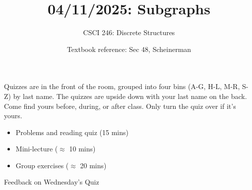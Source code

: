 \documentclass[10pt]{beamer}
\begin{document}




\title{04/11/2025: Subgraphs}
\author{CSCI 246: Discrete Structures}
\date{Textbook reference: Sec 48, Scheinerman}

\begin{frame}
    \titlepage 
\end{frame}


\begin{frame}
\small
\begin{mygreenbox}[title=Graded Quiz Pickup]
Quizzes are in the front of the room, grouped into four bins (A-G, H-L, M-R, S-Z) by last name. The quizzes are upside down with your last name on the back. Come find yours before, during, or after class. Only turn the quiz over if it's yours.
\end{mygreenbox} 
\vfill 
%
\vfill 
\begin{myyellowbox}[title=Today's Agenda]
\begin{itemize}
	\item Problems and reading quiz (15 mins)
	\item Mini-lecture ($\approx$ 10 mins)
	\item Group exercises ($\approx$ 20 mins)
\end{itemize}


\end{myyellowbox}
\vfill 

\end{frame}






\begin{frame}[standout]
Feedback on Wednesday's Quiz
\end{frame}
\end{document}
